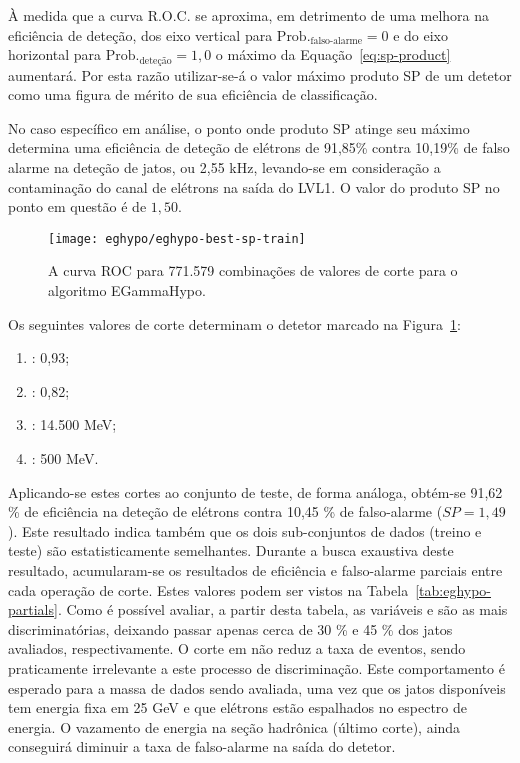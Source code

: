 À medida que a curva R.O.C. se aproxima, em detrimento de uma melhora na
eficiência de deteção, dos eixo vertical para
$\text{Prob.}_\text{falso-alarme} = 0$ e do eixo horizontal para
$\text{Prob.}_\text{deteção} = 1,0$ o máximo da Equação~\ref{eq:sp-product}
aumentará. Por esta razão utilizar-se-á o valor máximo produto SP de um
detetor como uma figura de mérito de sua eficiência de classificação.

No caso específico em análise, o ponto onde produto SP atinge seu máximo
determina uma eficiência de deteção de elétrons de 91,85\% contra 10,19\% de
falso alarme na deteção de jatos, ou 2,55 kHz, levando-se em consideração a
contaminação do canal de elétrons na saída do LVL1. O valor do produto SP no
ponto em questão é de $1,50$.

\begin{figure}
\begin{center}
\texttt{[image: eghypo/eghypo-best-sp-train]}
\end{center}
\caption{A curva ROC para 771.579 combinações de valores de corte para o
algoritmo EGammaHypo.}
\label{fig:eghypo-best-sp-train}
\end{figure}

Os seguintes valores de corte determinam o detetor marcado na
Figura~\ref{fig:eghypo-best-sp-train}:
\begin{enumerate}
\item \rcore: 0,93;
\item \eratio: 0,82;
\item \etem: 14.500 MeV;
\item \ethad: 500 MeV.
\end{enumerate}

Aplicando-se estes cortes ao conjunto de teste, de forma análoga, obtém-se
91,62 \% de eficiência na deteção de elétrons contra 10,45 \% de falso-alarme
($SP = 1,49$). Este resultado indica também que os dois sub-conjuntos de dados
(treino e teste) são estatisticamente semelhantes. Durante a busca exaustiva
deste resultado, acumularam-se os resultados de eficiência e falso-alarme
parciais entre cada operação de corte. Estes valores podem ser vistos na
Tabela~\ref{tab:eghypo-partials}. Como é possível avaliar, a partir desta
tabela, as variáveis \rcore e \eratio são as mais discriminatórias, deixando
passar apenas cerca de 30 \% e 45 \% dos jatos avaliados, respectivamente. O
corte em \etem não reduz a taxa de eventos, sendo praticamente irrelevante a
este processo de discriminação. Este comportamento é esperado para a massa de
dados sendo avaliada, uma vez que os jatos disponíveis tem energia fixa em 25
GeV e que elétrons estão espalhados no espectro de energia. O vazamento de
energia na seção hadrônica (último corte), ainda conseguirá diminuir a taxa de
falso-alarme na saída do detetor.

